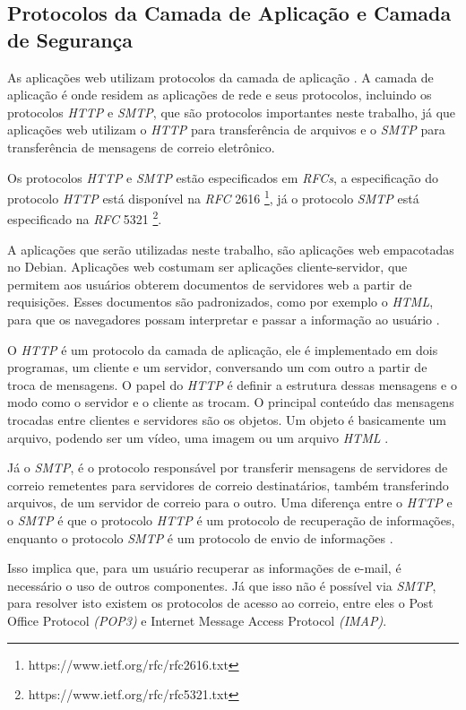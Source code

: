 \subsection{Protocolos da Camada de Aplicação e Camada de Segurança}

As aplicações web utilizam protocolos da camada de aplicação \cite{kurose2010redes}. 
A camada de aplicação é onde residem as 
aplicações de rede e seus protocolos, incluindo os protocolos \textit{HTTP} e 
\textit{SMTP}, que são protocolos importantes neste trabalho, já que 
aplicações web utilizam o \textit{HTTP} para transferência de arquivos e o \textit{SMTP} para
transferência de mensagens de correio eletrônico. 

Os protocolos \textit{HTTP} e \textit{SMTP} estão especificados em \textit{RFCs}, a 
especificação do protocolo \textit{HTTP} está disponível na \textit{RFC} 2616 
\footnote{https://www.ietf.org/rfc/rfc2616.txt}, já o protocolo \textit{SMTP} 
está especificado na \textit{RFC} 5321 \footnote{https://www.ietf.org/rfc/rfc5321.txt}.

A aplicações que serão utilizadas neste trabalho, são aplicações web empacotadas no
Debian. Aplicações web costumam ser aplicações cliente-servidor, que permitem aos
usuários obterem documentos de servidores web a partir de requisições. Esses documentos são padronizados, como por exemplo o \textit{HTML}, 
para que os navegadores possam interpretar e passar a informação ao usuário 
\cite{kurose2010redes}.

O \textit{HTTP} é um protocolo da camada de aplicação, ele é 
implementado em dois programas, um cliente e um servidor, conversando um 
com outro a partir de troca de mensagens. O papel do \textit{HTTP} é definir a 
estrutura dessas mensagens e o modo como o servidor e o cliente as trocam. O 
principal conteúdo das mensagens trocadas entre clientes e servidores são os 
objetos. Um objeto é basicamente um arquivo, podendo ser um vídeo, uma imagem 
ou um arquivo \textit{HTML} \cite{kurose2010redes}.

Já o \textit{SMTP}, é o protocolo responsável por transferir mensagens de servidores de correio
remetentes para servidores de correio destinatários, também transferindo arquivos,
de um servidor de correio para o outro. Uma diferença entre o \textit{HTTP} e o \textit{SMTP}
é que o protocolo \textit{HTTP} é um protocolo de recuperação de informações, enquanto
o protocolo \textit{SMTP} é um protocolo de envio de informações \cite{kurose2010redes}. 

Isso implica que, para um usuário recuperar as informações de e-mail, é necessário 
o uso de outros componentes. Já que isso não é possível via \textit{SMTP}, para 
resolver isto existem os protocolos de acesso ao correio, entre eles o 
Post Office Protocol \textit{(POP3)} e Internet Message Access Protocol \textit{(IMAP)}.

